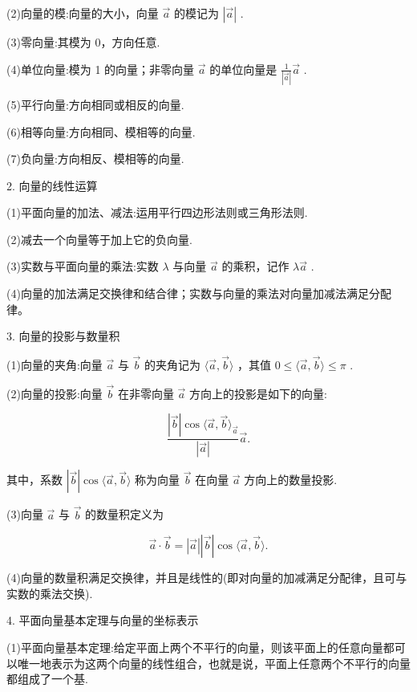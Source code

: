\documentclass[10pt]{article}
\begin{document}
(2)向量的模:向量的大小，向量 \(\overrightarrow{a}\) 的模记为 \(\left| \overrightarrow{a}\right|\) .

(3)零向量:其模为 0，方向任意.

(4)单位向量:模为 1 的向量；非零向量 \(\overrightarrow{a}\) 的单位向量是 \(\frac{1}{\left| \overrightarrow{a}\right| }\overrightarrow{a}\) .

(5)平行向量:方向相同或相反的向量.

(6)相等向量:方向相同、模相等的向量.

(7)负向量:方向相反、模相等的向量.

2. 向量的线性运算

(1)平面向量的加法、减法:运用平行四边形法则或三角形法则.

(2)减去一个向量等于加上它的负向量.

(3)实数与平面向量的乘法:实数 \(\lambda\) 与向量 \(\overrightarrow{a}\) 的乘积，记作 \(\lambda \overrightarrow{a}\) .

(4)向量的加法满足交换律和结合律；实数与向量的乘法对向量加减法满足分配律。

3. 向量的投影与数量积

(1)向量的夹角:向量 \(\overrightarrow{a}\) 与 \(\overrightarrow{b}\) 的夹角记为 \(\langle \overrightarrow{a},\overrightarrow{b}\rangle\) ，其值 \(0 \leq  \langle \overrightarrow{a},\overrightarrow{b}\rangle  \leq  \pi\) .

(2)向量的投影:向量 \(\overrightarrow{b}\) 在非零向量 \(\overrightarrow{a}\) 方向上的投影是如下的向量:

\[
\frac{\left| \overrightarrow{b}\right| \cos \langle \overrightarrow{a},\overrightarrow{b}{\rangle }_{\overrightarrow{a}}}{\left| \overrightarrow{a}\right| }\overrightarrow{a}.
\]

其中，系数 \(\left| \overrightarrow{b}\right| \cos \langle \overrightarrow{a},\overrightarrow{b}\rangle\) 称为向量 \(\overrightarrow{b}\) 在向量 \(\overrightarrow{a}\) 方向上的数量投影.

(3)向量 \(\overrightarrow{a}\) 与 \(\overrightarrow{b}\) 的数量积定义为

\[
\overrightarrow{a} \cdot  \overrightarrow{b} = \left| \overrightarrow{a}\right| \left| \overrightarrow{b}\right| \cos \langle \overrightarrow{a},\overrightarrow{b}\rangle .
\]

(4)向量的数量积满足交换律，并且是线性的(即对向量的加减满足分配律，且可与实数的乘法交换).

4. 平面向量基本定理与向量的坐标表示

(1)平面向量基本定理:给定平面上两个不平行的向量，则该平面上的任意向量都可以唯一地表示为这两个向量的线性组合，也就是说，平面上任意两个不平行的向量都组成了一个基.
\end{document}

